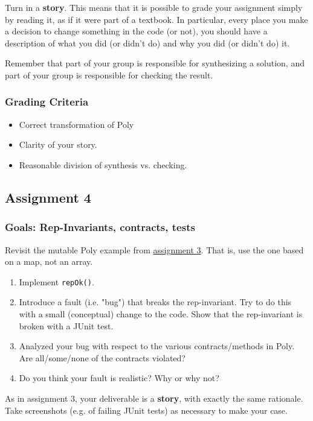 \documentclass[11pt]{article}
\begin{document}
Turn in a \textbf{story}. This means that it is possible to grade your assignment simply by reading it, as if it were part of a textbook. In particular, every place you make a decision to change something in the code (or not), you should have a description of what you did (or didn't do) and why you did (or didn't do) it.

Remember that part of your group is responsible for synthesizing a solution, and part of your group is responsible for checking the result.

\subsubsection{Grading Criteria}
\label{sec:org600dbc9}
\begin{itemize}
\item Correct transformation of Poly
\item Clarity of your story.
\item Reasonable division of synthesis vs. checking.
\end{itemize}


\subsection{Assignment 4}
\label{sec:orgc646439}
\subsubsection{Goals: Rep-Invariants, contracts, tests}
\label{sec:orgab2f9ef}

Revisit the mutable Poly example from \href{./assign03.html}{assignment 3}. That is, use the one based on a map, not an array.

\begin{enumerate}
\item Implement \texttt{repOk()}.
\item Introduce a fault (i.e. "bug") that breaks the rep-invariant. Try to do this with a small (conceptual) change to the code. Show that the rep-invariant is broken with a JUnit test.
\item Analyzed your bug with respect to the various contracts/methods in Poly. Are all/some/none of the contracts violated?
\item Do you think your fault is realistic? Why or why not?
\end{enumerate}

As in assignment 3, your deliverable is a \textbf{story}, with exactly the same rationale. Take screenshots (e.g. of failing JUnit tests) as necessary to make your case.
\end{document}
